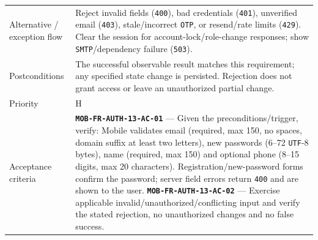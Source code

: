 \begin{longtable}{@{}P{0.23000\SRSWidth}P{0.77000\SRSWidth}@{}}
Alternative /\allowbreak{} exception flow & Reject invalid fields (\texttt{400}), bad credentials (\texttt{401}), unverified email (\texttt{403}), stale/\allowbreak{}incorrect \texttt{OTP}, or resend/\allowbreak{}rate limits (\texttt{429}). Clear the session for account-lock/\allowbreak{}role-change responses; show \texttt{SMTP}/\allowbreak{}dependency failure (\texttt{503}). \\[3pt]
Postconditions & The successful observable result matches this requirement; any specified state change is persisted. Rejection does not grant access or leave an unauthorized partial change. \\[3pt]
Priority & H \\[3pt]
Acceptance criteria & \textbf{\texttt{MOB-\allowbreak{}FR-\allowbreak{}AUTH-\allowbreak{}13-\allowbreak{}AC-\allowbreak{}01}} — Given the preconditions/\allowbreak{}trigger, verify: Mobile validates email (required, max 150, no spaces, domain suffix at least two letters), new passwords (6–72 \texttt{UTF}-8 bytes), name (required, max 150) and optional phone (8–15 digits, max 20 characters). Registration/\allowbreak{}new-password forms confirm the password; server field errors return \texttt{400} and are shown to the user. \textbf{\texttt{MOB-\allowbreak{}FR-\allowbreak{}AUTH-\allowbreak{}13-\allowbreak{}AC-\allowbreak{}02}} — Exercise applicable invalid/\allowbreak{}unauthorized/\allowbreak{}conflicting input and verify the stated rejection, no unauthorized changes and no false success. \\[3pt]

\end{longtable}
